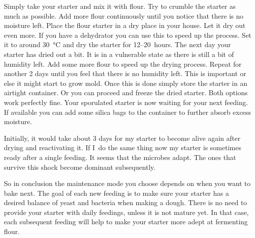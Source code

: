 Simply take your starter and mix it with flour. Try to crumble the starter as
much as possible. Add more flour continuously until you notice that there is no
moisture left. Place the flour starter in a dry place in your house. Let it
dry out even more. If you have a dehydrator you can use this to speed up the
process. Set it to around  \qty{30}{\degreeCelsius} and dry the starter for 12--20~hours. The next
day your starter has dried out a bit. It is in a vulnerable state as there is still a bit
of humidity left. Add some more flour to speed up the drying process. Repeat
for another 2 days until you feel that there is no humidity left. This is
important or else it might start to grow mold. Once this is done simply store the
starter in an airtight container. Or you can proceed and freeze
the dried starter. Both options work perfectly fine. Your sporulated starter
is now waiting for your next feeding. If available you can add some silica
bags to the container to further absorb excess moisture.

Initially, it would take about 3 days for my starter to become alive again
after drying and reactivating it. If I~do the same thing now my starter is
sometimes ready after a single feeding. It seems that the microbes adapt. The ones
that survive this shock become dominant subsequently.

So in conclusion the maintenance mode you choose depends on when you want to bake next.
The goal of each new feeding is to make sure your starter
has a desired balance of yeast and bacteria when making a dough. There is no need to provide your
starter with daily feedings, unless it is not mature yet. In that case, each
subsequent feeding will help to make your starter more adept at fermenting
flour.
